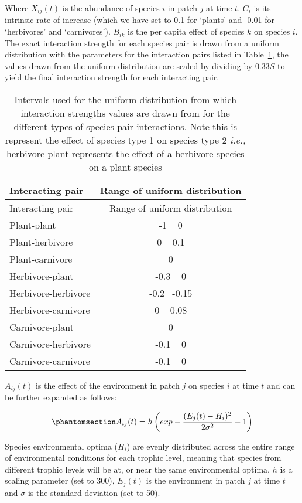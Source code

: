 \documentclass[
]{agujournal2019}
\begin{document}
Where \(X_{ij}(t)\) is the abundance of species \(i\) in patch \(j\) at
time \(t\). \(C_i\) is its intrinsic rate of increase (which we have set
to 0.1 for `plants' and -0.01 for `herbivores' and `carnivores').
\(B_{ik}\) is the per capita effect of species \(k\) on species \(i\).
The exact interaction strength for each species pair is drawn from a
uniform distribution with the parameters for the interaction pairs
listed in Table~\ref{tbl-interaction_strength}, the values drawn from
the uniform distribution are scaled by dividing by \(0.33S\) to yield
the final interaction strength for each interacting pair.

\begin{longtable}[]{@{}lc@{}}
\caption{Intervals used for the uniform distribution from which
interaction strengths values are drawn from for the different types of
species pair interactions. Note this is represent the effect of species
type 1 on species type 2 \emph{i.e.,} herbivore-plant represents the
effect of a herbivore species on a plant
species}\label{tbl-interaction_strength}\tabularnewline
\toprule\noalign{}
Interacting pair & Range of uniform distribution \\
\midrule\noalign{}
\endfirsthead
\toprule\noalign{}
Interacting pair & Range of uniform distribution \\
\midrule\noalign{}
\endhead
\bottomrule\noalign{}
\endlastfoot
Plant-plant & -1 -- 0 \\
Plant-herbivore & 0 -- 0.1 \\
Plant-carnivore & 0 \\
Herbivore-plant & -0.3 -- 0 \\
Herbivore-herbivore & -0.2-- -0.15 \\
Herbivore-carnivore & 0 -- 0.08 \\
Carnivore-plant & 0 \\
Carnivore-herbivore & -0.1 -- 0 \\
Carnivore-carnivore & -0.1 -- 0 \\
\end{longtable}

\(A_{ij}(t)\) is the effect of the environment in patch \(j\) on species
\(i\) at time \(t\) and can be further expanded as follows:

\begin{equation}\phantomsection\label{eq-metacomm_env}{
A_{ij}(t)=h\left(exp-\frac{(E_{j}(t)-H_{i})^2}{2\sigma^2}-1\right)
}\end{equation}

Species environmental optima (\(H_i\)) are evenly distributed across the
entire range of environmental conditions for each trophic level, meaning
that species from different trophic levels will be at, or near the same
environmental optima. \(h\) is a scaling parameter (set to 300),
\(E_j(t)\) is the environment in patch \(j\) at time \(t\) and
\(\sigma\) is the standard deviation (set to 50).
\end{document}
